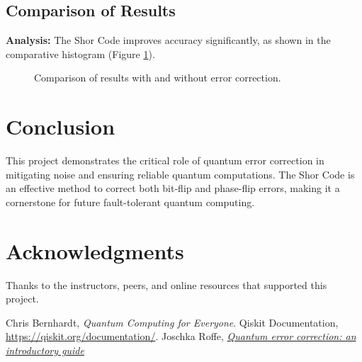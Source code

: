 \documentclass[10pt]{article}
\begin{document}
\begin{multicols}{2}
\subsection*{Comparison of Results}
\textbf{Analysis:} The Shor Code improves accuracy significantly, as shown in the comparative histogram (Figure \ref{fig:comparison}).
\begin{figure}[H]
    \centering
    \caption{Comparison of results with and without error correction.}
    \label{fig:comparison}
\end{figure}

\section*{Conclusion}
This project demonstrates the critical role of quantum error correction in mitigating noise and ensuring reliable quantum computations. The Shor Code is an effective method to correct both bit-flip and phase-flip errors, making it a cornerstone for future fault-tolerant quantum computing.

\section*{Acknowledgments}
Thanks to the instructors, peers, and online resources that supported this project.

\end{multicols}

\begin{thebibliography}{9}
Chris Bernhardt, \textit{Quantum Computing for Everyone}.
Qiskit Documentation, \url{https://qiskit.org/documentation/}.
Joschka Roffe, \href{http://dx.doi.org/10.1080/00107514.2019.1667078}{\textit{Quantum error correction: an introductory guide}}
\end{thebibliography}
\end{document}
